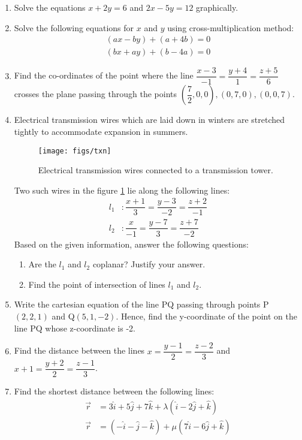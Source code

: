 \begin{enumerate}

\item Solve the equations $x+2y=6$ and $2x-5y=12$ graphically.	

	\item Solve the following equations for $x$ and $y$ using cross-multiplication method:
		\begin{align}
			(ax-by)+(a+4b)=0\\(bx+ay)+(b-4a)=0
		\end{align}

	\item Find the co-ordinates of the point where the line $\dfrac{x-3}{-1}=\dfrac{y+4}{1}=\dfrac{z+5}{6}$ crosses the plane passing through the points $\left(\dfrac{7}{2},0,0\right),(0,7,0),(0,0,7)$.

	\item Electrical transmission wires which are laid down in winters are stretched tightly to accommodate expansion in summers.
		\begin{figure}[H]
			\centering
			\texttt{[image: figs/txn]}
			\caption{Electrical transmission wires connected to a transmission tower.}
			\label{fig:txn1}
		\end{figure}
		Two such wires in the figure \ref{fig:txn1} lie along the following lines:
		\begin{align}
			l_1 &: \dfrac{x+1}{3}=\dfrac{y-3}{-2}=\dfrac{z+2}{-1}\\
			l_2 &: \dfrac{x}{-1}=\dfrac{y-7}{3}=\dfrac{z+7}{-2}
		\end{align}
		Based on the given information, answer the following questions:
		\begin{enumerate}
			\item	Are the $l_1$ and $l_2$ coplanar? Justify your answer.
			\item    Find the point of intersection of lines $l_1$ and $l_2$.
		\end{enumerate}

	\item Write the cartesian equation of the line PQ passing through points P$(2,2,1)$ and Q$(5,1,-2)$. Hence, find the y-coordinate of the point on the line PQ whose z-coordinate is -2.

	\item Find the distance between the lines $x=\dfrac{y-1}{2}=\dfrac{z-2}{3}$ and $x+1=\dfrac{y+2}{2}=\dfrac{z-1}{3}$.
	
	\item Find the shortest distance between the following lines:
		\begin{align}
			\vec{r}&=3\hat{i}+5\hat{j}+7\hat{k}+\lambda(\hat{i}-2\hat{j}+\hat{k})\\\vec{r}&=(-\hat{i}-\hat{j}-\hat{k})+\mu(7\hat{i}-6\hat{j}+\hat{k})
		\end{align}


\end{enumerate}

